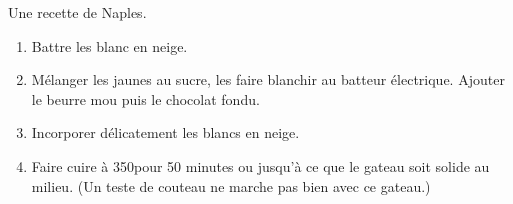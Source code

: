
Une recette de Naples.

\begin{ingredients}
\end{ingredients}

\begin{recipe}
  \begin{enumerate}

  \item Battre les blanc en neige.

  \item M\'elanger les jaunes au sucre, les faire blanchir au batteur
    électrique.  Ajouter le beurre mou puis le chocolat fondu.

  \item Incorporer d\'elicatement les blancs en neige.

  \item Faire cuire \`a 350\F pour 50 minutes ou jusqu'\`a ce que le
    gateau soit solide au milieu.  (Un teste de couteau ne marche pas
    bien avec ce gateau.)

  \end{enumerate}
\end{recipe}

